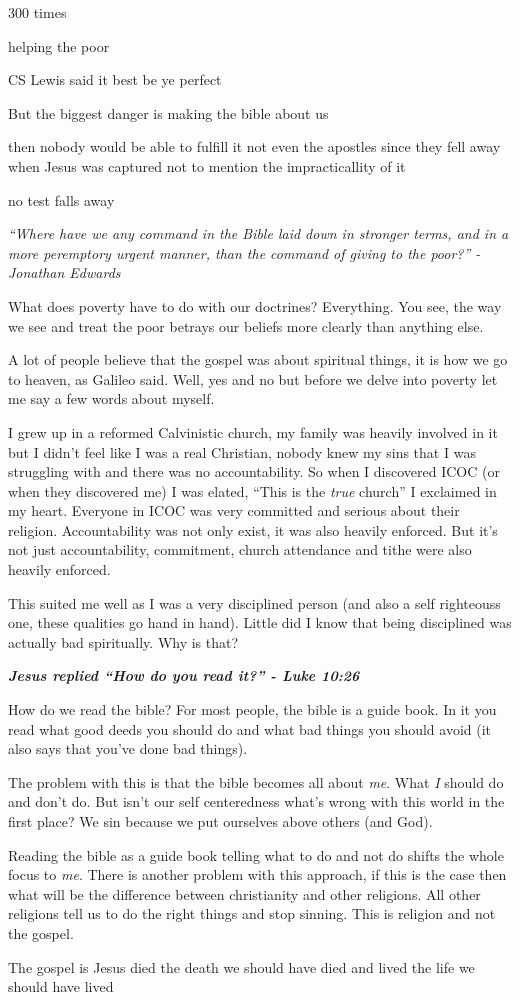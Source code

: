 \documentclass[aps,preprint,preprintnumbers,nofootinbib,showpacs,prd]{revtex4-1}
\begin{document}
300 times

helping the poor


CS Lewis said it best be ye perfect




But the biggest danger is making the bible about us



then nobody would be able to fulfill it not even the apostles since they fell away when Jesus was captured not to mention the impracticallity of it


no test
falls away


{\it ``Where have we any command in the Bible laid down in stronger terms, and in a more peremptory urgent manner, than the command of giving to the poor?'' - Jonathan Edwards}

\bigskip
\bigskip

What does poverty have to do with our doctrines? Everything. You see, the way we see and treat the poor betrays our beliefs more clearly than anything else.

A lot of people believe that the gospel was about spiritual things, it is how we go to heaven, as Galileo said. Well, yes and no but before we delve into poverty let me say a few words about myself.

I grew up in a reformed Calvinistic church, my family was heavily involved in it but I didn't feel like I was a real Christian, nobody knew my sins that I was struggling with and there was no accountability. So when I discovered ICOC (or when they discovered me) I was elated, ``This is the {\it true} church'' I exclaimed in my heart. Everyone in ICOC was very committed and serious about their religion. Accountability was not only exist, it was also heavily enforced. But it's not just accountability, commitment, church attendance and tithe were also heavily enforced.

This suited me well as I was a very disciplined person (and also a self righteouss one, these qualities go hand in hand). Little did I know that being disciplined was actually bad spiritually. Why is that?

\bigskip
\textbf{\textit{Jesus replied ``How do you read it?'' - Luke 10:26 }}

How do we read the bible? For most people, the bible is a guide book. In it you read what good deeds you should do and what bad things you should avoid (it also says that you've done bad things).

The problem with this is that the bible becomes all about {\it me}. What {\it I} should do and don't do. But isn't our self centeredness what's wrong with this world in the first place? We sin because we put ourselves above others (and God).

Reading the bible as a guide book telling what to do and not do shifts the whole focus to {\it me}. There is another problem with this approach, if this is the case then what will be the difference between christianity and other religions. All other religions tell us to do the right things and stop sinning. This is religion and not the gospel.

The gospel is Jesus died the death we should have died and lived the life we should have lived
\end{document}
